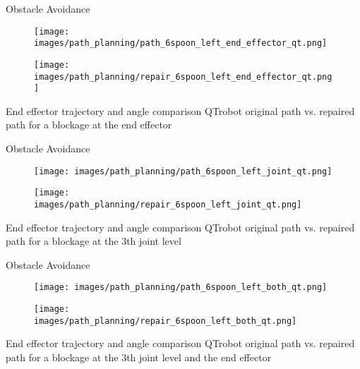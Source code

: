\documentclass[aspectratio=169]{beamer}
\begin{document}
\begin{frame}{Obstacle Avoidance}
	\begin{minipage}{0.33\linewidth}
		\centering	
		\begin{figure}[h!]
			\texttt{[image: images/path\_planning/path\_6spoon\_left\_end\_effector\_qt.png]}
		\end{figure}
	\end{minipage}		
	\begin{minipage}{0.66\linewidth}
		\centering	
		\begin{figure}[h!]
			\texttt{[image: images/path\_planning/repair\_6spoon\_left\_end\_effector\_qt.png]}
		\end{figure}
	\end{minipage}
	End effector trajectory and angle comparison QTrobot original path vs. repaired path for a blockage at the end effector
\end{frame}

\begin{frame}{Obstacle Avoidance}
	\begin{minipage}{0.33\linewidth}
		\centering	
		\begin{figure}[h!]
			\texttt{[image: images/path\_planning/path\_6spoon\_left\_joint\_qt.png]}
		\end{figure}
	\end{minipage}		
	\begin{minipage}{0.66\linewidth}
		\centering	
		\begin{figure}[h!]
			\texttt{[image: images/path\_planning/repair\_6spoon\_left\_joint\_qt.png]}
		\end{figure}
	\end{minipage}
	End effector trajectory and angle comparison QTrobot original path vs. repaired path for a blockage at the 3th joint level
\end{frame}

\begin{frame}{Obstacle Avoidance}
	\begin{minipage}{0.33\linewidth}
		\centering	
		\begin{figure}[h!]
			\texttt{[image: images/path\_planning/path\_6spoon\_left\_both\_qt.png]}
		\end{figure}
	\end{minipage}		
	\begin{minipage}{0.66\linewidth}
		\centering	
		\begin{figure}[h!]
			\texttt{[image: images/path\_planning/repair\_6spoon\_left\_both\_qt.png]}
		\end{figure}
	\end{minipage}
	End effector trajectory and angle comparison QTrobot original path vs. repaired path for a  blockage at the 3th joint level and the end effector
\end{frame}
\end{document}
